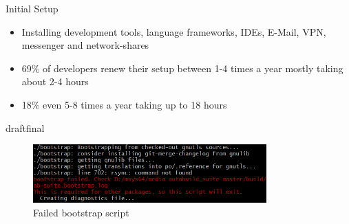 \documentclass{beamer}
\def\final{final}
\def\status{draft}
\begin{document}
\begin{frame}{}
  \vspace{-0.2cm}
  \begin{center}
    \Large Initial Setup
  \end{center}

  \vspace{-0.2cm}
  \begin{block}{}
    \begin{itemize}
      \small
      \setlength\itemsep{0em}
      \item Installing development tools, language frameworks, IDEs, E-Mail, VPN, messenger and network-shares
      \item 69\% of developers renew their setup between 1-4 times a year mostly taking about 2-4 hours
      \item 18\% even 5-8 times a year taking up to 18 hours
    \end{itemize}
  \end{block}

  \ifx\status\final{}
    \pause{}
  \fi

  \vspace{0.5cm}
  \begin{figure}
    \includegraphics[width=0.8\textwidth]{img/terminal_small.png}
    \caption{Failed bootstrap script}
  \end{figure}

\end{frame}

\end{document}
